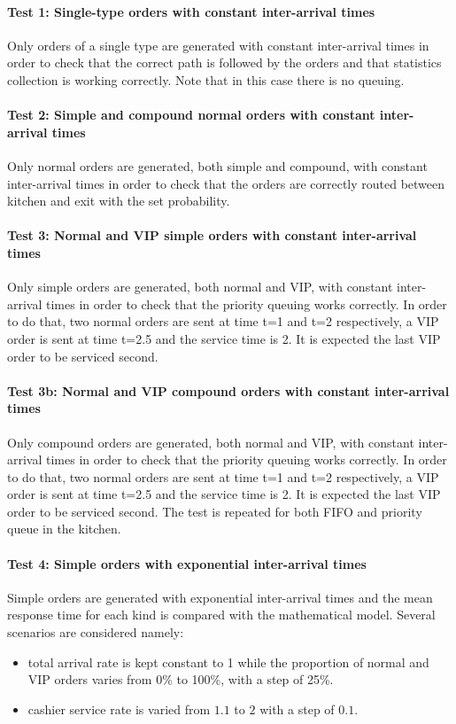 \paragraph{Test 1: Single-type orders with constant inter-arrival times}
Only orders of a single type are generated with constant inter-arrival times
in order to check that the correct path is followed by the orders and that 
statistics collection is working correctly. 
Note that in this case there is no queuing.

\paragraph{Test 2: Simple and compound normal orders with constant inter-arrival times}
Only normal orders are generated, both simple and compound, with constant inter-arrival times
in order to check that the orders are correctly routed between kitchen and exit with 
the set probability.

\paragraph{Test 3: Normal and VIP simple orders with constant inter-arrival times}
Only simple orders are generated, both normal and VIP, with constant inter-arrival times
in order to check that the priority queuing works correctly. In order to do that, 
two normal orders are sent at time t=1 and t=2 respectively, a VIP order is sent 
at time t=2.5 and the service time is 2. It is expected the last VIP order to be 
serviced second.

\paragraph{Test 3b: Normal and VIP compound orders with constant inter-arrival times}
Only compound orders are generated, both normal and VIP, with constant inter-arrival times
in order to check that the priority queuing works correctly. In order to do that, 
two normal orders are sent at time t=1 and t=2 respectively, a VIP order is sent 
at time t=2.5 and the service time is 2. It is expected the last VIP order to be 
serviced second. The test is repeated for both FIFO and priority queue in the kitchen.

\paragraph{Test 4: Simple orders with exponential inter-arrival times}
Simple orders are generated with exponential inter-arrival times and the 
mean response time for each kind is compared with the mathematical model. Several 
scenarios are considered namely:
\begin{itemize}
    \item total arrival rate is kept constant to 1 while the proportion of 
        normal and VIP orders varies from 0\% to 100\%, with a step of 25\%.
    \item cashier service rate is varied from $1.1$ to $2$ with a step of $0.1$.
\end{itemize}

